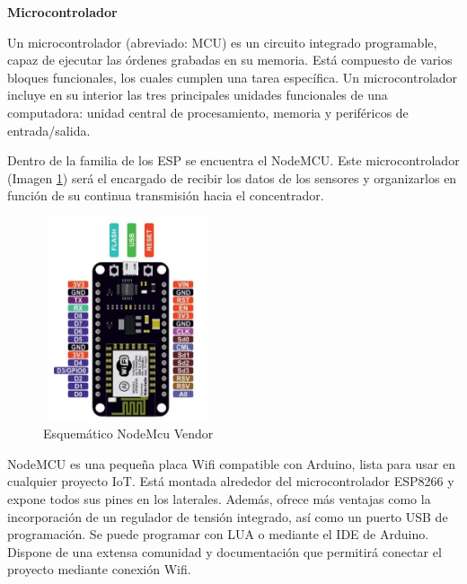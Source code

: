     \textbf{Microcontrolador}

    Un microcontrolador (abreviado: MCU) es un circuito integrado programable, capaz de ejecutar las órdenes grabadas en su memoria. Está compuesto de varios bloques funcionales, los cuales cumplen una tarea específica. Un microcontrolador incluye en su interior las tres principales unidades funcionales de una computadora: unidad central de procesamiento, memoria y periféricos de entrada/salida.

    Dentro de la familia de los ESP se encuentra el NodeMCU. Este microcontrolador (Imagen \ref{imag:nodemcu}) será el encargado de recibir los datos de los sensores y organizarlos en función de su continua transmisión hacia el concentrador.\\

    \begin{figure}[h]
        \centering
        \includegraphics[width=5cm, height=6cm]{imagenes/nodemcu0.jpg}
        \caption{Esquemático NodeMcu Vendor}
        \label{imag:nodemcu}
    \end{figure}
    
    
    NodeMCU es una pequeña placa Wifi compatible con Arduino, lista para usar en cualquier proyecto IoT. Está montada alrededor del microcontrolador ESP8266 y expone todos sus pines en los laterales. Además, ofrece más ventajas como la incorporación de un regulador de tensión integrado, así como un puerto USB de programación. Se puede programar con LUA o mediante el IDE de Arduino.\\

    Dispone de una extensa comunidad y documentación que permitirá conectar el proyecto mediante conexión Wifi.\\

